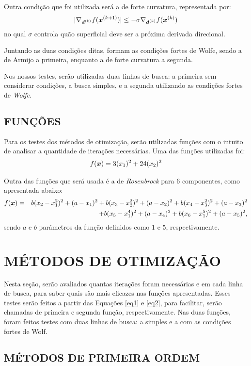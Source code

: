 \documentclass[12pt]{article}
\begin{document}
Outra condição que foi utilizada será a de forte curvatura, representada por:
\begin{equation}
|\nabla_{\boldsymbol{d}^{(k)}}f(\boldsymbol{x}^{(k+1)})| \leq  - \sigma \nabla_{\boldsymbol{d}^{(k)}}f(\boldsymbol{x}^{(k)})
\end{equation}
no qual $\sigma$ controla quão superficial deve ser a próxima derivada direcional.

Juntando as duas condições ditas, formam as condições fortes de Wolfe, sendo a de Armijo a primeira, enquanto a de forte curvatura a segunda.

Nos nossos testes, serão utilizadas duas linhas de busca: a primeira sem considerar condições, a busca simples, e a segunda  utilizando as condições fortes de \textit{Wolfe}.
 



\subsection{FUNÇÕES}
Para os testes dos métodos de otimização, serão utilizadas funções com o intuito de analisar a quantidade de iterações necessárias. Uma das funções utilizadas foi:
\begin{equation}
f(\boldsymbol{x}) = 3(x_1)^2 + 24(x_2)^2 \label{eq1}
\end{equation}

Outra das funções que será usada é a de \textit{Rosenbrock} para 6 componentes, como apresentada abaixo:
\begin{eqnarray}
f(\boldsymbol{x}) &=& b(x_2 - x_1^2)^2+ (a - x_1)^2 + b(x_3 - x_2^2)^2 + (a-x_2)^2 
+ b(x_4 - x_3^2)^2+ (a - x_3)^2 \nonumber\\
&&+ b(x_5 - x_1^4)^2+ (a - x_4)^2 + b(x_6 - x_1^5)^2+ (a - x_5)^2, \label{eq2}
\end{eqnarray}
sendo $a$ e $b$ parâmetros da função definidos como $1$ e $5$, respectivamente.
 
 \section{MÉTODOS DE OTIMIZAÇÃO}
 Nesta seção, serão avaliados quantas iterações foram necessárias e em cada linha de busca, para saber quais são mais eficazes nas funções apresentadas. Esses testes serão feitos a partir das Equações \ref{eq1} e \ref{eq2}, para facilitar, serão chamadas de primeira e segunda função, respectivamente. Nas duas funções, foram feitos testes com duas linhas de busca: a simples e a com as condições fortes de Wolf. 
\subsection{MÉTODOS DE PRIMEIRA ORDEM}
\end{document}
